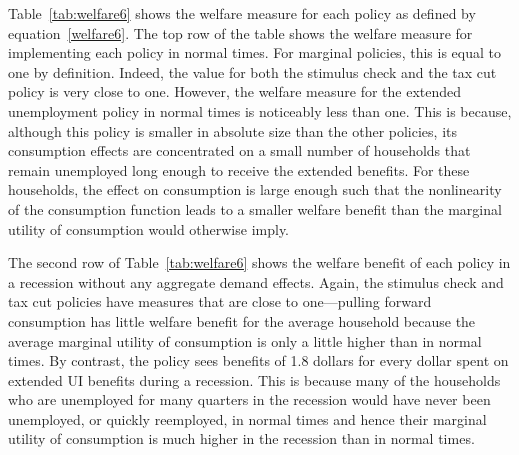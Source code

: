 \documentclass[qe,draft]{econsocart}
\theoremstyle{plain}
\theoremstyle{definition}
\begin{document}
\vspace{0.5em}


Table~\ref{tab:welfare6} shows the welfare measure for each policy as defined by equation~\eqref{welfare6}.
The top row of the table shows the welfare measure for implementing each policy in normal times.
For marginal policies, this is equal to one by definition.
Indeed, the value for both the stimulus check and the tax cut policy is very close to one.
However, the welfare measure for the extended unemployment policy in normal times is noticeably less than one.
This is because, although this policy is smaller in absolute size than the other policies, its consumption effects are concentrated on a small number of households that remain unemployed long enough to receive the extended benefits.
For these households, the effect on consumption is large enough such that the nonlinearity of the consumption function leads to a smaller welfare benefit than the marginal utility of consumption would otherwise imply.

The second row of Table~\ref{tab:welfare6} shows the welfare benefit of each policy in a recession without any aggregate demand effects.
Again, the stimulus check and tax cut policies have measures that are close to one---pulling forward consumption has little welfare benefit for the average household because the average marginal utility of consumption is only a little higher than in normal times.
By contrast, the policy sees benefits of 1.8 dollars for every dollar spent on extended UI benefits during a recession.
This is because many of the households who are unemployed for many quarters in the recession would have never been unemployed, or quickly reemployed, in normal times and hence their marginal utility of consumption is much higher in the recession than in normal times.
\end{document}
